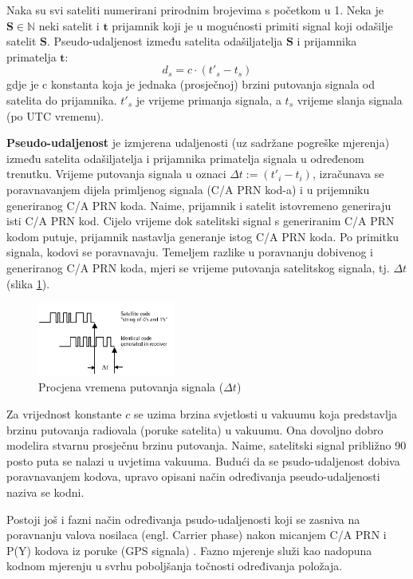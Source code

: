 \documentclass[a4paper,twoside,12pt]{memoir} %
\begin{document}
	\begin{defn}
		Naka su svi sateliti numerirani prirodnim  brojevima s početkom 
		u 1. Neka je $\mathbf{S} \in \mathbb{N}$ neki satelit i $\mathbf{t}$ prijamnik
		koji je u mogućnosti primiti signal koji odašilje satelit $\mathbf{S}$. Pseudo-udaljenost
		između satelita odašiljatelja $\mathbf{S}$ i prijamnika primatelja $\textbf{t}$:
		$$d_s = c\cdot(t'_s- t_s)$$
		gdje je c konstanta koja je jednaka (prosječnoj) brzini putovanja signala od satelita do prijamnika. $t'_s$ je vrijeme primanja signala, a $t_s$ vrijeme slanja signala
		(po UTC vremenu).
	\end{defn}
	\textbf{Pseudo-udaljenost} je izmjerena udaljenosti (uz sadržane pogreške mjerenja) između satelita odašiljatelja i prijamnika primatelja signala u određenom trenutku.
	Vrijeme putovanja signala u oznaci $\Delta t := (t'_i- t_i)$, izračunava se poravnavanjem dijela primljenog signala (C/A PRN kod-a) i u prijemniku generiranog C/A PRN koda.
	Naime, prijamnik i satelit istovremeno generiraju isti C/A PRN kod. Cijelo vrijeme dok satelitski signal s generiranim
	C/A PRN kodom putuje, prijamnik nastavlja generanje istog C/A PRN koda. Po primitku signala,
	kodovi se poravnavaju. Temeljem razlike u poravnanju dobivenog i generiranog C/A PRN koda,
	mjeri se vrijeme putovanja satelitskog signala, tj. $\Delta t$ (slika \ref{fig:deltat}).
	\begin{figure}[H]
		\centering
		\includegraphics[width=0.4\textwidth]{deltat}
		\caption{Procjena vremena putovanja signala ($\Delta t$)}
		\label{fig:deltat}
	\end{figure}
	Za vrijednost konstante $c$ se uzima brzina svjetlosti u vakuumu koja predstavlja brzinu putovanja radiovala (poruke satelita) u vakuumu. Ona dovoljno dobro modelira stvarnu prosječnu brzinu putovanja. Naime, satelitski signal približno 90 posto puta se nalazi u uvjetima vakuuma.
	Budući da se psudo-udaljenost dobiva poravnavanjem kodova\label{stranica:kodno},
	upravo opisani način određivanja pseudo-udaljenosti naziva se kodni.
	
	Postoji još i fazni način određivanja psudo-udaljenosti koji se zasniva na poravnanju valova nosilaca (engl. Carrier phase) nakon micanjem C/A PRN i P(Y) kodova  iz poruke (GPS signala) \cite{fazno:kodno}.
	Fazno mjerenje služi kao nadopuna kodnom mjerenju u svrhu poboljšanja točnosti određivanja položaja.
	
\end{document}
